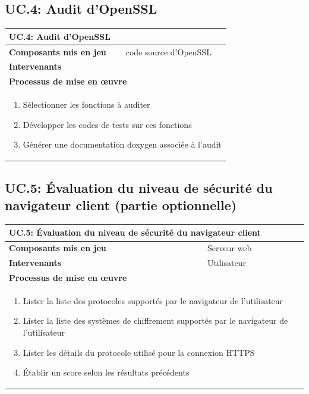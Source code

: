 \documentclass[a4paper,11pt,french]{article}
\begin{document}
\subsection{UC.4: Audit d'OpenSSL}
\begin{center}
	\vspace*{0.7cm}
	\begin{tabularx}{16cm}{|l|X|}
	\hline
	\multicolumn{2}{|l|}{\textbf{UC.4: Audit d'OpenSSL}}\\
	\hline
	\textbf{Composants mis en jeu} & code source d'OpenSSL\\
	\hline
	\textbf{Intervenants} & \\
	\hline
	\multicolumn{2}{|l|}{\textbf{Processus de mise en \oe uvre}}\\
	\hline
	\multicolumn{2}{|p{15cm}|}{
	\begin{enumerate}
	\item Sélectionner les fonctions à auditer
	\item Développer les codes de tests sur ces fonctions
	\item Générer une documentation doxygen associée à l'audit
	\end{enumerate}
	}\\
	\hline
	\end{tabularx}
\end{center}

\subsection{UC.5: Évaluation du niveau de sécurité du navigateur client (partie optionnelle)}
\begin{center}
	\vspace*{0.7cm}
	\begin{tabularx}{16cm}{|l|X|}
	\hline
	\multicolumn{2}{|l|}{\textbf{UC.5: Évaluation du niveau de sécurité du navigateur client}}\\
	\hline
	\textbf{Composants mis en jeu} & Serveur web\\
	\hline
	\textbf{Intervenants} & Utilisateur\\
	\hline
	\multicolumn{2}{|l|}{\textbf{Processus de mise en \oe uvre}}\\
	\hline
	\multicolumn{2}{|p{15cm}|}{
	\begin{enumerate}
	\item Lister la liste des protocoles supportés par le navigateur de l'utilisateur
	\item Lister la liste des systèmes de chiffrement supportés par le navigateur de l'utilisateur
	\item Lister les détails du protocole utilisé pour la connexion HTTPS
	\item Établir un score selon les résultats précédents
	\end{enumerate}
	}\\
	\hline
	\end{tabularx}
\end{center}
\end{document}
